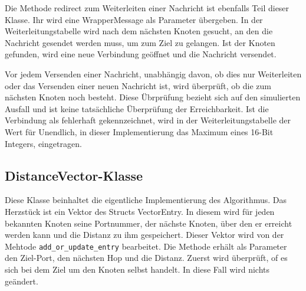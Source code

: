 Die Methode redirect zum Weiterleiten einer Nachricht ist ebenfalls Teil dieser Klasse. Ihr wird eine WrapperMessage als Parameter übergeben. In der Weiterleitungstabelle wird nach dem nächsten Knoten gesucht, an den die Nachricht gesendet werden muss, um zum Ziel zu gelangen. Ist der Knoten gefunden, wird eine neue Verbindung geöffnet und die Nachricht versendet. 

Vor jedem Versenden einer Nachricht, unabhängig davon, ob dies nur Weiterleiten oder das Versenden einer neuen Nachricht ist, wird überprüft, ob die zum nächsten Knoten noch besteht. Diese Übrprüfung bezieht sich auf den simulierten Ausfall und ist keine tatsächliche Überprüfung der Erreichbarkeit. Ist die Verbindung als fehlerhaft gekennzeichnet, wird in der Weiterleitungstabelle der Wert für Unendlich, in dieser Implementierung das Maximum eines 16-Bit Integers, eingetragen.

\subsection{DistanceVector-Klasse}
Diese Klasse beinhaltet die eigentliche Implementierung des Algorithmus. Das Herzstück ist ein Vektor des Structs VectorEntry. In diesem wird für jeden bekannten Knoten seine Portnummer, der nächste Knoten, über den er erreicht werden kann und die Distanz zu ihm gespeichert. Dieser Vektor wird von der Mehtode \verb|add_or_update_entry| bearbeitet. Die Methode erhält als Parameter den Ziel-Port, den nächsten Hop und die Distanz. Zuerst wird überprüft, of es sich bei dem Ziel um den Knoten selbst handelt. In diese Fall wird nichts geändert.